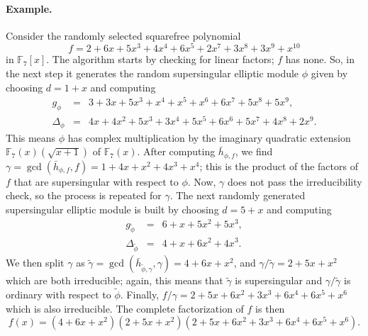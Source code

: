 \documentclass[12pt]{article}
\def\F{\ensuremath{\mathbb{F}}}
\begin{document}
\paragraph{Example.}
Consider the randomly selected squarefree polynomial 
\[ f = 2 + 6x + 5x^3 + 4x^4 + 6x^5 + 2x^7 + 3x^8 + 3x^9 + x^{10} \]
in $\F_7[x]$. The algorithm starts by checking for linear factors; $f$ has none. So, in the 
next step it generates the random supersingular elliptic module $\phi$ given by
choosing $d=1+x$ and computing
\[
\begin{array}{rll}
	g_\phi & = & 3 + 3x + 5x^3 + x^4 + x^5 + x^6 + 6x^7 + 5x^8 + 5x^9,\\
        \Delta_\phi&=&4x+4x^2+5x^3+3x^4+5x^5+6x^6+5x^7+4x^8+2x^9.
\end{array}
\]
This means $\phi$ has complex multiplication by the imaginary
quadratic extension $\F_7(x)(\sqrt{x + 1})$ of $\F_7(x)$. After
computing $\bar h_{\phi, f}$, we
find $\gamma = \gcd(\bar h_{\phi, f}, f) = 1 + 4x + x^2 + 4x^3 + x^4$; this is
the product of the factors of $f$ that are supersingular with respect
to $\phi$. Now, $\gamma$ does not pass the irreducibility check, so the
process is repeated for $\gamma$. The next randomly generated supersingular
elliptic module is built by choosing $d=5+x$ and computing
\[
\begin{array}{rll}
	g_{\tilde\phi} & = & 6 + x + 5x^2 + 5x^3,\\
	\Delta_{\tilde \phi} & = & 4+x + 6x^2 + 4x^3.
\end{array}
\]
We then split $\gamma$ as $ \tilde \gamma = \gcd(\bar h_{\tilde \phi,
  \gamma}, \gamma) = 4 + 6x + x^2$, and $\gamma/\tilde \gamma = 2 + 5x
+ x^2$ which are both irreducible; again, this means that $\tilde \gamma$
is supersingular and $\gamma/\tilde \gamma$ is ordinary with respect to $\tilde
\phi$. Finally, $f / \gamma = 2 + 5x + 6x^2 + 3x^3 + 6x^4 + 6x^5 + x^6$
which is also irreducible. The complete factorization of $f$ is
then \[ f(x) = (4 + 6x + x^2)(2 + 5x + x^2)(2 + 5x + 6x^2 + 3x^3 +
6x^4 + 6x^5 + x^6).\]



\end{document}
